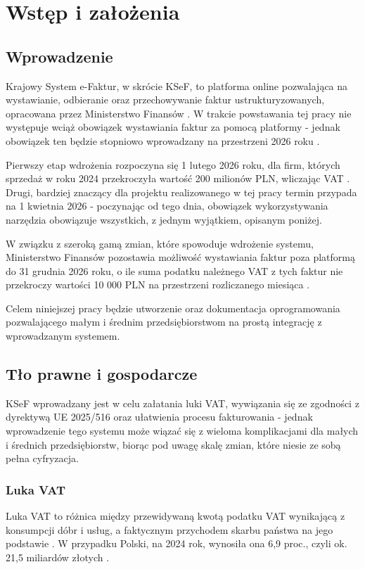 \chapter{Wstęp i założenia}
\section{Wprowadzenie}
Krajowy System e-Faktur, w skrócie KSeF, to platforma online pozwalająca na wystawianie, odbieranie oraz przechowywanie faktur ustrukturyzowanych, opracowana przez Ministerstwo Finansów \parencite{ministerstwo_finansow_pytania_2025}. 
W trakcie powstawania tej pracy nie występuje wciąż obowiązek wystawiania faktur za pomocą platformy - jednak obowiązek ten będzie stopniowo wprowadzany na przestrzeni 2026 roku \parencite{ministerstwo_finansow_pytania_2025}. 

Pierwszy etap wdrożenia rozpoczyna się 1 lutego 2026 roku, dla firm, których sprzedaż w roku 2024 przekroczyła wartość 200 milionów PLN, wliczając VAT \parencite{ministerstwo_finansow_terminy_2025}. Drugi, bardziej znaczący dla projektu realizowanego w tej pracy termin przypada na 1 kwietnia 2026 \parencite{ministerstwo_finansow_terminy_2025} - poczynając od tego dnia, obowiązek wykorzystywania narzędzia obowiązuje wszystkich, z jednym wyjątkiem, opisanym poniżej.

W związku z szeroką gamą zmian, które spowoduje wdrożenie systemu, Ministerstwo Finansów pozostawia możliwość wystawiania faktur poza platformą do 31 grudnia 2026 roku, o ile suma podatku należnego VAT z tych faktur nie przekroczy wartości 10 000 PLN na przestrzeni rozliczanego miesiąca \parencite{ministerstwo_finansow_zakres_2025}. 

Celem niniejszej pracy będzie utworzenie oraz dokumentacja oprogramowania pozwalającego małym i średnim przedsiębiorstwom na prostą integrację z wprowadzanym systemem. 

\section{Tło prawne i gospodarcze}
KSeF wprowadzany jest w celu załatania luki VAT, wywiązania się ze zgodności z dyrektywą UE 2025/516 oraz ułatwienia procesu fakturowania - jednak wprowadzenie tego systemu może wiązać się z wieloma komplikacjami dla małych i średnich przedsiębiorstw, biorąc pod uwagę skalę zmian, które niesie ze sobą pełna cyfryzacja.

\subsection{Luka VAT}
Luka VAT to różnica między przewidywaną kwotą podatku VAT wynikającą z konsumpcji dóbr i usług, a faktycznym przychodem skarbu państwa na jego podstawie \parencite{mf_raport_luka_2019}. W przypadku Polski, na 2024 rok, wynosiła ona 6,9 proc., czyli ok. 21,5 miliardów złotych \parencite{mf_wiadomosci_luka_2024}.

